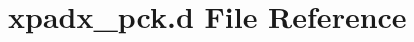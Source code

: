 \hypertarget{xpadx__pck_8d}{\section{xpadx\-\_\-pck.\-d \-File \-Reference}
\label{xpadx__pck_8d}
}
